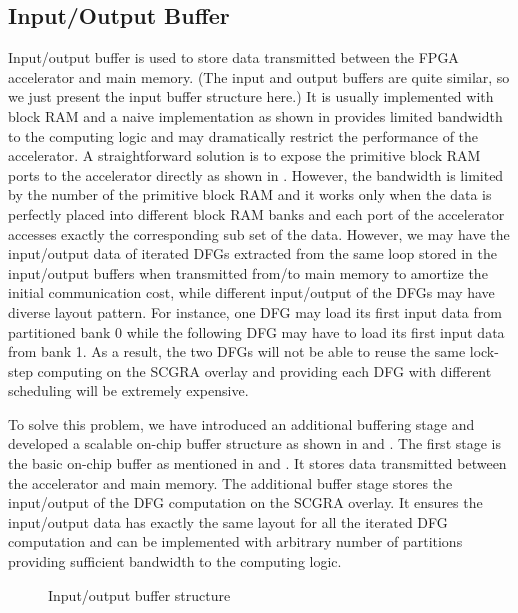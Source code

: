 \subsection{Input/Output Buffer}
Input/output buffer is used to store data transmitted between the FPGA 
accelerator and main memory. (The input and output buffers are quite similar, so 
we just present the input buffer structure here.) 
It is usually implemented with block RAM and 
a naive implementation as shown in  
provides limited bandwidth to the computing logic and may dramatically 
restrict the performance of the accelerator. A straightforward solution is to 
expose the primitive block RAM ports to the accelerator 
directly as shown in . However, the bandwidth is 
limited by the number of the primitive block RAM and it works only when 
the data is perfectly placed into different block RAM banks and each port of 
the accelerator accesses exactly the corresponding sub set of the data. However, 
we may have the input/output data of iterated DFGs extracted from the same loop stored in the
input/output buffers when transmitted from/to main memory to amortize the initial communication
cost, while different input/output of the DFGs may have diverse layout pattern. For instance, one DFG 
may load its first input data from partitioned bank 0 while the 
following DFG may have to load its first input data from bank 1. As a result, 
the two DFGs will not be able to reuse the same lock-step computing on the SCGRA overlay and
providing each DFG with different scheduling will be extremely expensive.

To solve this problem, we have introduced an additional buffering stage and developed 
a scalable on-chip buffer structure as shown in  
and . The first stage is the basic on-chip buffer as 
mentioned in  and . It stores 
data transmitted between the accelerator and main memory. The additional 
buffer stage stores the input/output of the DFG computation on the SCGRA overlay. It ensures the 
input/output data has exactly the same layout for all the iterated DFG computation and can be 
implemented with arbitrary number of partitions providing sufficient bandwidth to the computing
logic. 

\begin{figure}[tb]
    \centering
	\qquad
    \hfill
    \caption{Input/output buffer structure}
	\label{fig:on-chip-buffer}
\end{figure}

